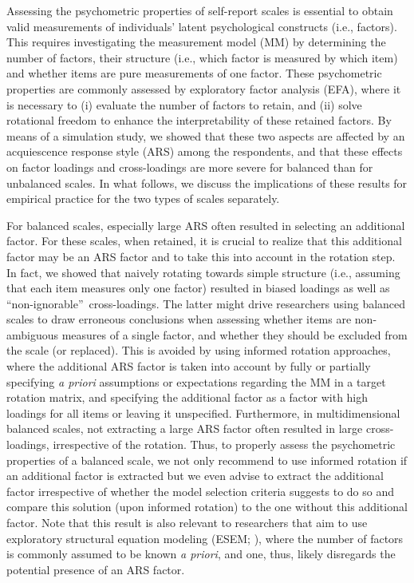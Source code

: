 \documentclass[a4paper,man,natbib]{apa6}
\begin{document}
\begin{linenumbers}
Assessing the psychometric properties of self-report scales is essential to obtain valid measurements of individuals' latent psychological constructs (i.e., factors). This requires investigating the measurement model (MM) by determining the number of factors, their structure (i.e., which factor is measured by which item) and whether items are pure measurements of one factor. These psychometric properties are commonly assessed by exploratory factor analysis (EFA), where it is necessary to (i) evaluate the number of factors to retain, and (ii) solve rotational freedom to enhance the interpretability of these retained factors. By means of a simulation study, we showed that these two aspects are affected by an acquiescence response style (ARS) among the respondents, and that these effects on factor loadings and cross-loadings are more severe for balanced than for unbalanced scales. In what follows, we discuss the implications of these results for empirical practice for the two types of scales separately.

For balanced scales, especially large ARS often resulted in selecting an additional factor. For these scales, when retained, it is crucial to realize that this additional factor may be an ARS factor and to take this into account in the rotation step. In fact, we showed that naively rotating towards simple structure (i.e., assuming that each item measures only one factor) resulted in biased loadings as well as \textquotedblleft non-ignorable\textquotedblright \, cross-loadings. The latter might drive researchers using balanced scales to draw erroneous conclusions when assessing whether items are non-ambiguous measures of a single factor, and whether they should be excluded from the scale (or replaced). This is avoided by using informed rotation approaches, where the additional ARS factor is taken into account by fully or partially specifying \textit{a priori} assumptions or expectations regarding the MM in a target rotation matrix, and specifying the additional factor as a factor with high loadings for all items or leaving it unspecified.  Furthermore, in multidimensional balanced scales, not extracting a large ARS factor often resulted in large cross-loadings, irrespective of the rotation. Thus, to properly assess the psychometric properties of a balanced scale, we not only recommend to use informed rotation if an additional factor is extracted but we even advise to extract the additional factor irrespective of whether the model selection criteria suggests to do so and compare this solution (upon informed rotation) to the one without this additional factor. Note that this result is also relevant to researchers that aim to use exploratory structural equation modeling (ESEM; \citealp{asparouhov2009exploratory}), where the number of factors is commonly assumed to be known \textit{a priori}, and one, thus, likely disregards the potential presence of an ARS factor.


\end{linenumbers}
\end{document}

